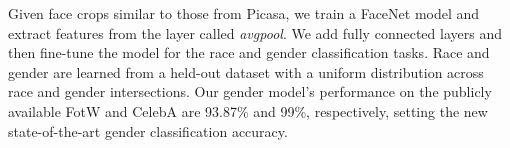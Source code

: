 \documentclass{article}
\begin{document}
Given face crops similar to those from Picasa, we train a FaceNet model \cite{facenet2016} and extract features from the layer called \textit{avgpool}. We add
fully connected layers and then fine-tune the model for the race and gender classification tasks. Race and gender are learned from a held-out dataset with a uniform distribution across race and gender intersections. Our gender model's performance on the publicly available FotW and CelebA are 93.87\% and 99\%, respectively, setting the new state-of-the-art gender classification accuracy.\vspace{-1em} %

\end{document}
